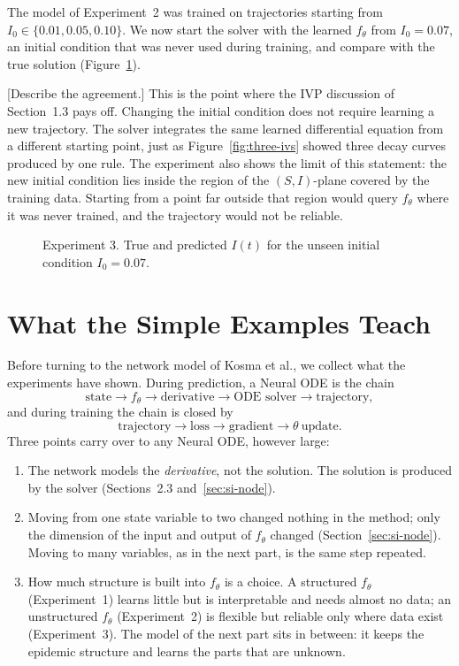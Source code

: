 \documentclass[11pt,a4paper]{article}
\newcommand{\figph}[2]{%
  \fbox{\parbox[c][3.2cm][c]{\dimexpr#1-2\fboxsep-2\fboxrule\relax}{%
    \centering\small\ttfamily [figure: #2]}}}
\begin{document}
The model of Experiment~2 was trained on trajectories starting from
$I_0 \in \{0.01, 0.05, 0.10\}$. We now start the solver with the learned
$f_\theta$ from $I_0 = 0.07$, an initial condition that was never used during
training, and compare with the true solution (Figure~\ref{fig:si-unseen}).

[Describe the agreement.] This is the point where the IVP discussion of
Section~1.3 pays off. Changing the initial condition does not require learning a
new trajectory. The solver integrates the same learned differential equation
from a different starting point, just as Figure~\ref{fig:three-ivs} showed three
decay curves produced by one rule. The experiment also shows the limit of this
statement: the new initial condition lies inside the region of the $(S,I)$-plane
covered by the training data. Starting from a point far outside that region
would query $f_\theta$ where it was never trained, and the trajectory would not
be reliable.

\begin{figure}[h]
  \centering
  \figph{0.9\textwidth}{fig\_si\_unseen\_ic}
  \caption{Experiment 3. True and predicted $I(t)$ for the unseen initial
  condition $I_0=0.07$.}
  \label{fig:si-unseen}
\end{figure}

\section{What the Simple Examples Teach}
\label{sec:lessons}

Before turning to the network model of Kosma et al., we collect what the
experiments have shown. During prediction, a Neural ODE is the chain
\[
  \boxed{\text{state}} \rightarrow \boxed{f_\theta} \rightarrow
  \boxed{\text{derivative}} \rightarrow \boxed{\text{ODE solver}} \rightarrow
  \boxed{\text{trajectory}},
\]
and during training the chain is closed by
\[
  \boxed{\text{trajectory}} \rightarrow \boxed{\text{loss}} \rightarrow
  \boxed{\text{gradient}} \rightarrow \boxed{\theta\ \text{update}}.
\]
Three points carry over to any Neural ODE, however large:
\begin{enumerate}
  \item The network models the \emph{derivative}, not the solution. The solution
  is produced by the solver (Sections~2.3 and~\ref{sec:si-node}).
  \item Moving from one state variable to two changed nothing in the method; only
  the dimension of the input and output of $f_\theta$ changed
  (Section~\ref{sec:si-node}). Moving to many variables, as in the next part,
  is the same step repeated.
  \item How much structure is built into $f_\theta$ is a choice. A structured
  $f_\theta$ (Experiment~1) learns little but is interpretable and needs almost
  no data; an unstructured $f_\theta$ (Experiment~2) is flexible but reliable
  only where data exist (Experiment~3). The model of the next part sits in
  between: it keeps the epidemic structure and learns the parts that are unknown.
\end{enumerate}
\end{document}
